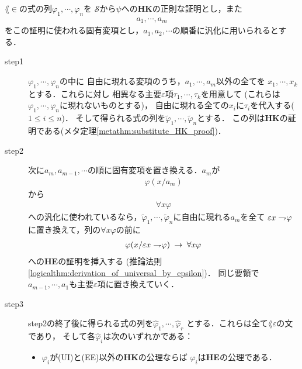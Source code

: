 	\begin{metaprf}
		$\lang{\in}$の式の列$\varphi_{1},\cdots,\varphi_{n}$を
		$\mathscr{S}$から$\psi$への{\bf HK}の正則な証明とし，また
		\begin{align}
			a_{1},\cdots,a_{m}
		\end{align}
		をこの証明に使われる固有変項とし，$a_{1},a_{2},\cdots$の順番に汎化に用いられるとする．
	
		\begin{description}
			\item[step1]
				$\varphi_{1},\cdots,\varphi_{n}$の中に
				自由に現れる変項のうち，$a_{1},\cdots,a_{m}$以外の全てを
				$x_{1},\cdots,x_{k}$とする．これらに対し
				相異なる主要$\varepsilon$項$\tau_{1},\cdots,\tau_{k}$を用意して
				(これらは$\varphi_{1},\cdots,\varphi_{n}$に現れないものとする)，
				自由に現れる全ての$x_{i}$に$\tau_{i}$を代入する($1 \leq i \leq n$)．
				そして得られる式の列を$\tilde{\varphi}_{1},\cdots,\tilde{\varphi}_{n}$とする．
				この列は{\bf HK}の証明である(メタ定理\ref{metathm:substitute_HK_proof})．
				
			\item[step2]
				次に$a_{m},a_{m-1},\cdots$の順に固有変項を置き換える．$a_{m}$が
				\begin{align}
					\varphi(x/a_{m})
				\end{align}
				から
				\begin{align}
					\forall x \varphi
				\end{align}
				への汎化に使われているなら，$\tilde{\varphi}_{1},\cdots,
				\tilde{\varphi}_{n}$に自由に現れる$a_{m}$を全て
				$\varepsilon x \rightharpoondown\hspace{-0.25em} \varphi$に置き換えて，列の$\forall x \varphi$の前に
				\begin{align}
					\varphi(x/\varepsilon x \rightharpoondown\hspace{-0.25em} \varphi) 
					\hspace{0.25em}\rightarrow\hspace{0.25em} \forall x \varphi
				\end{align}
				への{\bf HE}の証明を挿入する
				(推論法則\ref{logicalthm:derivation_of_universal_by_epsilon})．
				同じ要領で$a_{m-1},\cdots,a_{1}$も主要$\varepsilon$項に置き換えていく．
				
			\item[step3]
				step2の終了後に得られる式の列を$\hat{\varphi}_{1},\cdots,\hat{\varphi}_{r}$
				とする．これらは全て$\lang{\varepsilon}$の文であり，
				そして各$\hat{\varphi}_{i}$は次のいずれかである：
				\begin{itemize}
					\item $\varphi_{i}$が(UI)と(EE)以外の{\bf HK}の公理ならば
						$\hat{\varphi}_{i}$は{\bf HE}の公理である．
						

\end{itemize}
\end{description}
\end{metaprf}
